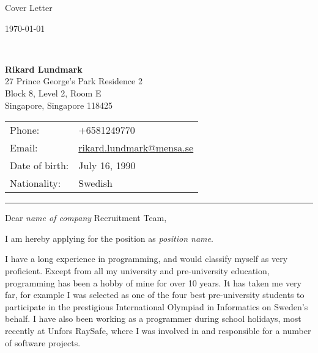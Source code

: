 






\newcommand{\companyname}{\emph{name of company} }
\newcommand{\positionname}{\emph{position name}}



\vspace*{-1cm}
\begin{minipage}{0.5\linewidth}
{\Huge Cover Letter }
\end{minipage}
\begin{minipage}{0.5\linewidth}
{\hfill \small \ddmmyyyydate \today}
\end{minipage}
{\tiny }\\

\begin{minipage}{0.5\linewidth}
  {\bf Rikard Lundmark} \\
  27 Prince George's Park Residence 2\\
  Block 8, Level 2, Room E \\
  Singapore, Singapore 118425    
\end{minipage}
\begin{minipage}{0.5\linewidth}
  \begin{tabular}{ll}
    Phone: & +6581249770\\
    Email: & \href{mailto:rikard.lundmark@mensa.se}{rikard.lundmark@mensa.se}\\
    Date of birth: & July 16, 1990 \\
    Nationality: & Swedish
  \end{tabular}
\end{minipage}


\begin{minipage}{1.0\linewidth}
\begin{center}
\hrule
\end{center}
\end{minipage}

Dear \companyname Recruitment Team,


I am hereby applying for the position as \positionname.


I have a long experience in programming, and would classify myself as very proficient. Except from all my university and pre-university education, programming has been a hobby of mine for over 10 years. It has taken me very far, for example I was selected as one of the four best pre-university students to participate in the prestigious International Olympiad in Informatics on Sweden's behalf. I have also been working as a programmer during school holidays, most recently at Unfors RaySafe, where I was involved in and responsible for a number of software projects. 



